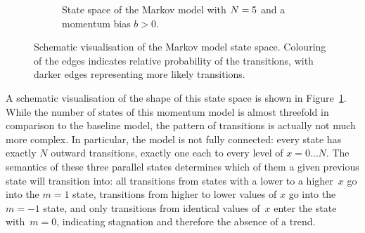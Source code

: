\begin{figure}
\begin{subfigure}[b]{\textwidth}

\caption{State space of the Markov model with $N=5$ and a momentum bias $b>0$.}\label{fig:markovstatespacemomentum}
\end{subfigure}

\caption[Schematic visualisation of the Markov model state space]{Schematic visualisation of the Markov model state space. Colouring of the edges indicates relative probability of the transitions, with darker edges representing more likely transitions.} \label{fig:markovstatespace}
\end{figure}

A schematic visualisation of the shape of this state space is shown in Figure~\ref{fig:markovstatespacemomentum}. While the number of states of this momentum model is almost threefold in comparison to the baseline model, the pattern of transitions is actually not much more complex. In particular, the model is not fully connected: every state has exactly $N$ outward transitions, exactly one each to every level of $x=0\ldots N$. 
The semantics of these three parallel states determines which of them a given previous state will transition into: all transitions from states with a lower to a higher~$x$ go into the $m=1$ state, transitions from higher to lower values of $x$ go into the $m=-1$ state, and only transitions from identical values of~$x$ enter the state with~$m=0$, indicating stagnation and therefore the absence of a trend.

